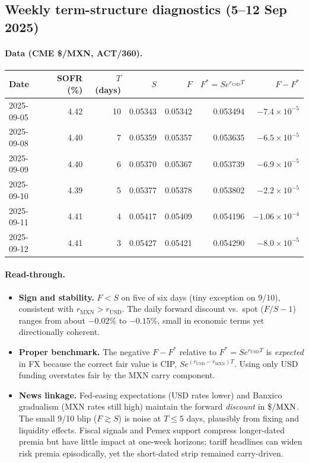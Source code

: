 \documentclass[11pt,a4paper]{article} %
\begin{document}
\subsection{Weekly term-structure diagnostics (5–12 Sep 2025)}
\paragraph{Data (CME \$/MXN, ACT/360).}
\begin{center}
\begin{tabular}{lrrrrrr}
\toprule
Date & SOFR (\%) & \(T\) (days) & \(S\) & \(F\) & \(F^{*}=S e^{r_{\mathrm{USD}}T}\) & \(F{-}F^{*}\) \\
\midrule
2025-09-05 & 4.42 & 10 & 0.05343 & 0.05342 & 0.053494 & \(-7.4\times10^{-5}\) \\
2025-09-08 & 4.40 & 7  & 0.05359 & 0.05357 & 0.053635 & \(-6.5\times10^{-5}\) \\
2025-09-09 & 4.40 & 6  & 0.05370 & 0.05367 & 0.053739 & \(-6.9\times10^{-5}\) \\
2025-09-10 & 4.39 & 5  & 0.05377 & 0.05378 & 0.053802 & \(-2.2\times10^{-5}\) \\
2025-09-11 & 4.41 & 4  & 0.05417 & 0.05409 & 0.054196 & \(-1.06\times10^{-4}\) \\
2025-09-12 & 4.41 & 3  & 0.05427 & 0.05421 & 0.054290 & \(-8.0\times10^{-5}\) \\
\bottomrule
\end{tabular}
\end{center}

\paragraph{Read-through.}
\begin{itemize}
  \item \textbf{Sign and stability.} \(F<S\) on five of six days (tiny exception on 9/10), consistent with \(r_{\mathrm{MXN}}>r_{\mathrm{USD}}\). The daily forward discount vs.\ spot (\(F/S-1\)) ranges from about \(-0.02\%\) to \(-0.15\%\), small in economic terms yet directionally coherent.
  \item \textbf{Proper benchmark.} The negative \(F-F^{*}\) relative to \(F^{*}=S e^{r_{\mathrm{USD}}T}\) is \emph{expected} in FX because the correct fair value is CIP, \(S e^{(r_{\mathrm{USD}}-r_{\mathrm{MXN}})T}\). Using only USD funding overstates fair by the MXN carry component.
  \item \textbf{News linkage.} Fed-easing expectations (USD rates lower) and Banxico gradualism (MXN rates still high) maintain the forward \emph{discount} in \(\$/{\rm MXN}\). The small 9/10 blip (\(F\gtrsim S\)) is noise at \(T\leq 5\) days, plausibly from fixing and liquidity effects. Fiscal signals and Pemex support compress longer-dated premia but have little impact at one-week horizons; tariff headlines can widen risk premia episodically, yet the short-dated strip remained carry-driven.
\end{itemize}
\end{document}
